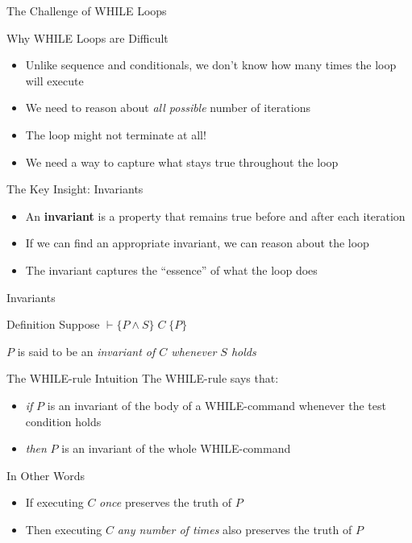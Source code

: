 \begin{frame}{The Challenge of WHILE Loops}
    \begin{block}{Why WHILE Loops are Difficult}
        \begin{itemize}
            \item Unlike sequence and conditionals, we don't know how many times the loop will execute
            \item We need to reason about \emph{all possible} number of iterations
            \item The loop might not terminate at all!
            \item We need a way to capture what stays true throughout the loop
        \end{itemize}
    \end{block}
    
    \begin{block}{The Key Insight: Invariants}
        \begin{itemize}
            \item An \textbf{invariant} is a property that remains true before and after each iteration
            \item If we can find an appropriate invariant, we can reason about the loop
            \item The invariant captures the ``essence'' of what the loop does
        \end{itemize}
    \end{block}
\end{frame}

\begin{frame}{Invariants}
    \begin{block}{Definition}
        Suppose $\vdash \{P \wedge S\} \; C \; \{P\}$
        
        $P$ is said to be an \emph{invariant of $C$ whenever $S$ holds}
    \end{block}
    
    \begin{block}{The WHILE-rule Intuition}
        The WHILE-rule says that:
        \begin{itemize}
            \item \emph{if} $P$ is an invariant of the body of a WHILE-command whenever the test condition holds
            \item \emph{then} $P$ is an invariant of the whole WHILE-command
        \end{itemize}
    \end{block}
    
    \begin{block}{In Other Words}
        \begin{itemize}
            \item If executing $C$ \emph{once} preserves the truth of $P$
            \item Then executing $C$ \emph{any number of times} also preserves the truth of $P$
        \end{itemize}
    \end{block}
\end{frame}

